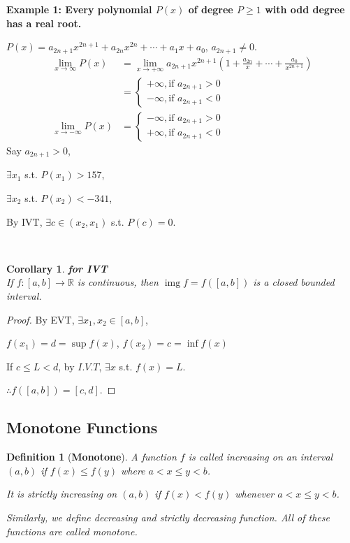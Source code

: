 \documentclass[12pt]{article}
\theoremstyle{plain}
\newtheorem{definition}{Definition}[subsection]
\newtheorem{corollary}{Corollary}[subsection]
\newcommand{\dlim}{\displaystyle\lim\limits}
\DeclareMathOperator{\Img}{img}
\begin{document}
	 {\color{Brown}
    \textbf{Example 1: Every polynomial $P(x)$ of degree $P\geq 1$ with odd 
    degree has a real root.}

    $P(x) = a_{2n+1} x^{2n+1} + a_{2n}x^{2n}+\cdots+a_1 x+a_0$, 
    $a_{2n+1}\neq 0$. 
    \begin{align*}
        \dlim_{x\to\infty} P(x)
        &=\dlim_{x\to+\infty} a_{2n+1}x^{2n+1} 
        (1+ \frac{a_{2n}}x + \cdots + \frac{a_0}{x^{2n+1}})\\
        &=\begin{cases}
            +\infty, \text{if } a_{2n+1}>0 \\
            -\infty, \text{if } a_{2n+1}<0
        \end{cases}\\
        \dlim_{x\to-\infty} P(x)
        &=\begin{cases}
            -\infty, \text{if } a_{2n+1}>0 \\
            +\infty, \text{if } a_{2n+1}<0
        \end{cases}
    \end{align*}
    Say $a_{2n+1}>0$, \begin{description}
        \item $\exists x_1$ s.t. $P(x_1)>157$,
        \item $\exists x_2$ s.t. $P(x_2)<-341$, 
    \end{description}

    By IVT, $\exists c\in (x_2, x_1)$ s.t. $P(c)=0$.}\\


    \begin{corollary}{\textbf{for IVT}\\}
        If $f: [a, b] \to \mathbb{R}$ is continuous, 
        then $\Img f = f([a,b])$ is a closed bounded interval.
    \end{corollary}
    \begin{proof}
        By EVT, $\exists x_1, x_2 \in [a,b]$,

        $f(x_1)=d =\sup f(x)$, $f(x_2)=c =\inf f(x)$

        If $c\leq L<d$, by $I.V.T$, $\exists x$ s.t. $f(x)=L$.

        $\therefore f([a,b])= [c,d]$.
    \end{proof}

    \vspace{1.0 in }
    
    \subsection{Monotone Functions}
    \begin{definition}[\textbf{Monotone}]
		A function $f$ is called increasing on an interval $(a,b)$ if 
		$f(x)\leq f(y)$ where $a<x\leq y<b$. 
		
		It is strictly increasing on $(a,b)$
		if $f(x)<f(y)$ whenever $a<x\leq y<b$. 

		Similarly, we define decreasing and strictly decreasing function. 
		All of these functions are called monotone. 
	\end{definition}
\end{document}
